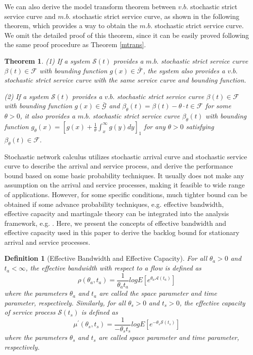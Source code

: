 \documentclass[paper]{ieice}
\newtheorem{theorem}{Theorem}
\newtheorem{definition}{Definition}
\begin{document}
We can also derive the model transform theorem between $v.b.$ stochastic strict service curve and $m.b.$ stochastic strict service curve, as shown in the following theorem, which provides a way to obtain the $m.b.$ stochastic strict service curve. We omit the detailed proof of this theorem, since it can be easily proved following the same proof procedure as Theorem \ref{mtrans}.
\begin{theorem}\label{mtrans2}
(1) If a system $\mathcal{S}(t)$ provides a $m.b.$ stochastic strict service curve $\beta(t)\in\mathcal{F}$ with bounding function $g(x)\in\bar{\mathcal{F}}$, the system also provides a $v.b.$ stochastic strict service curve with the same service curve and bounding function.

(2) If a system $\mathcal{S}(t)$ provides a $v.b.$ stochastic strict service curve $\beta(t)\in\mathcal{F}$ with bounding function $g(x)\in\bar{\mathcal{G}}$ and $\beta_{\theta}(t)=\beta(t)-\theta\cdot t\in\mathcal{F}$ for some $\theta>0$, it also provides a $m.b.$ stochastic strict service curve $\beta_{\theta}(t)$ with bounding function $g_{\theta}(x)=[g(x)+\frac{1}{\theta}\int_x^\infty g(y)dy]_1$ for any $\theta>0$ satisfying $\beta_{\theta}(t)\in\mathcal{F}$.
\end{theorem}

Stochastic network calculus utilizes stochastic arrival curve and stochastic service curve to describe the arrival and service process, and derive the performance bound based on some basic probability techniques. It usually does not make any assumption on the arrival and service processes, making it feasible to wide range of applications. However, for some specific conditions, much tighter bound can be obtained if some advance probability techniques, e.g. effective bandwidth, effective capacity and martingale theory can be integrated into the analysis framework, e.g. \cite{Li2007Network,5984844,jiang2009network,Ciucu2007Network}. Here, we present the concepts of effective bandwidth \cite{Kelly1996Note} and effective capacity \cite{Wu2003Effective} used in this paper to derive the backlog bound for stationary arrival and service processes.
\begin{definition}[Effective Bandwidth and Effective Capacity]
For all $\theta_a>0$ and $t_a<\infty$, the effective bandwidth with respect to a flow is defined as
$$\rho(\theta_a,t_a)=\frac{1}{\theta_a t_a}log E[e^{\theta_a \mathcal{A}(t_a)}]$$
where the parameters $\theta_a$ and $t_a$ are called the space parameter and time parameter, respectively. Similarly, for all $\theta_s>0$ and $t_s>0$, the effective capacity of service process $\mathcal{S}(t_s)$ is defined as
$$\mu^\prime(\theta_s,t_s)=\frac{1}{-\theta_s t_s}log E[e^{-\theta_s \mathcal{S}(t_s)}]$$
where the parameters $\theta_s$ and $t_s$ are called space parameter and time parameter, respectively.
\end{definition}
\end{document}
